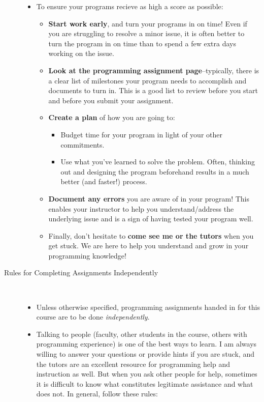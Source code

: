 \documentclass [letterpaper,11pt]{article}
\begin{document}
\begin{description}
\begin{itemize}
\item To ensure your programs recieve as high a score as possible:
	\begin{itemize}
	\item  \textbf{Start work early}, and turn your programs in on time!  Even if you are struggling to resolve a minor issue, it is often better to turn the program in on time than to spend a few extra days working on the issue.
	\item 	\textbf{Look at the programming assignment page}--typically, there is a clear list of milestones your program needs to accomplish and documents to turn in.  This is a good list to review before you start and before you submit your assignment.
	\item  \textbf{Create a plan} of how you are going to:
\begin{itemize}
\item Budget time for your program in light of your other commitments.
\item Use what you've learned to solve the problem.  Often, thinking out and designing the program beforehand results in a much better (and faster!) process.
\end{itemize}
	\item	\textbf{Document any errors} you are aware of in your program!  This enables your instructor to help you understand/address the underlying issue and is a sign of having tested your program well.
\item 	Finally, don't hesitate to \textbf{come see me or the tutors} when you get stuck.  We are here to help you understand and grow in your programming knowledge!
\end{itemize}
\end{itemize}

\item[Rules for Completing Assignments Independently]\
\begin{itemize}
        \item Unless otherwise specified, programming assignments handed in for this course are to be done \emph{independently}.  
        \item Talking to people (faculty, other students in the course, others with programming experience) is one of the best ways to learn.  I am always willing to answer your questions or provide hints if you are stuck, and the tutors are an excellent resource for programming help and instruction as well.  But when you ask other people for help, sometimes
        it is difficult to know what constitutes legitimate assistance and what does not.  In general, follow these rules:
        

\end{itemize}
\end{description}
\end{document}
